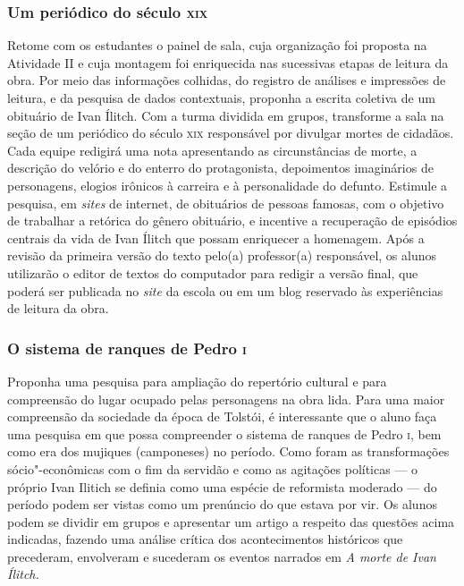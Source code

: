 \documentclass[12pt]{extarticle}
\begin{document}
\subsubsection{Um periódico do século \textsc{xix}}

Retome com os estudantes o painel de sala, cuja organização foi
proposta na Atividade II e cuja montagem foi enriquecida nas sucessivas
etapas de leitura da obra. Por meio das informações colhidas, do
registro de análises e impressões de leitura, e da pesquisa de dados
contextuais, proponha a escrita coletiva de um obituário de
Ivan Ílitch. Com a turma dividida em grupos, transforme a sala na
seção de um periódico do século \textsc{xix} responsável por divulgar mortes de
cidadãos. Cada equipe redigirá uma nota apresentando as circunstâncias
de morte, a descrição do velório e do enterro do protagonista,
depoimentos imaginários de personagens, elogios irônicos à carreira e
à personalidade do defunto. Estimule a pesquisa, em \emph{sites} de
internet, de obituários de pessoas famosas, com o objetivo de
trabalhar a retórica do gênero obituário, e incentive a
recuperação de episódios centrais da vida de Ivan Ílitch que possam
enriquecer a homenagem. Após a revisão da primeira versão do texto
pelo(a) professor(a) responsável, os alunos utilizarão o editor de
textos do computador para redigir a versão final, que poderá ser
publicada no \emph{site} da escola ou em um blog reservado às
experiências de leitura da obra.


\subsubsection{O sistema de ranques de Pedro \textsc{i}}

Proponha uma pesquisa para ampliação do repertório cultural e para
compreensão do lugar ocupado pelas personagens na obra lida. Para uma
maior compreensão da sociedade da época de Tolstói, é interessante que
o aluno faça uma pesquisa em que possa compreender o sistema de
ranques de Pedro \textsc{i}, bem como era dos mujiques (camponeses) no período.
Como foram as transformações sócio"-econômicas com o fim da servidão e
como as agitações políticas --- o próprio Ivan Ilitich se definia como
uma espécie de reformista moderado --- do período podem ser vistas como
um prenúncio do que estava por vir. Os alunos podem se dividir em
grupos e apresentar um artigo a respeito das questões acima indicadas,
fazendo uma análise crítica dos acontecimentos históricos que
precederam, envolveram e sucederam os eventos narrados em \emph{A
morte de Ivan Ílitch.}
\end{document}
